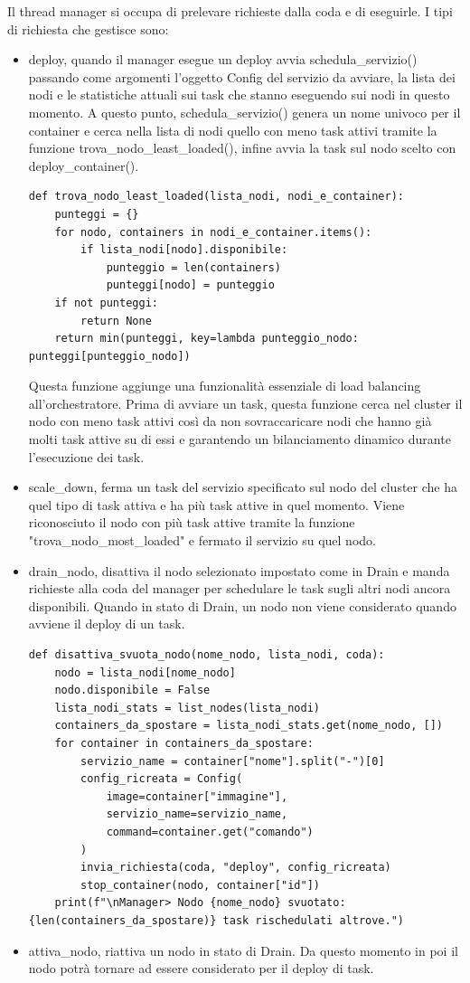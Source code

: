 \documentclass[12pt,a4paper]{article}
\begin{document}
Il thread manager si occupa di prelevare richieste dalla coda e di eseguirle. I tipi di richiesta che gestisce sono:
\begin{itemize}
    \item deploy, quando il manager esegue un deploy avvia schedula\_servizio() passando come argomenti l'oggetto Config del servizio da avviare, la lista dei nodi e le statistiche attuali sui task che stanno eseguendo sui nodi in questo momento. A questo punto, schedula\_servizio() genera un nome univoco per il container e cerca nella lista di nodi quello con meno task attivi tramite la funzione trova\_nodo\_least\_loaded(), infine avvia la task sul nodo scelto con deploy\_container().
    \begin{verbatim}
def trova_nodo_least_loaded(lista_nodi, nodi_e_container):
    punteggi = {}
    for nodo, containers in nodi_e_container.items():
        if lista_nodi[nodo].disponibile:
            punteggio = len(containers)
            punteggi[nodo] = punteggio
    if not punteggi:
        return None
    return min(punteggi, key=lambda punteggio_nodo: punteggi[punteggio_nodo])
\end{verbatim}
    Questa funzione aggiunge una funzionalità essenziale di load balancing all'orchestratore. Prima di avviare un task, questa funzione cerca nel cluster il nodo con meno task attivi così da non sovraccaricare nodi che hanno già molti task attive su di essi e garantendo un bilanciamento dinamico durante l'esecuzione dei task.
    
    \item scale\_down, ferma un task del servizio specificato sul nodo del cluster che ha quel tipo di task attiva e ha più task attive in quel momento. Viene riconosciuto il nodo con più task attive tramite la funzione "trova\_nodo\_most\_loaded" e fermato il servizio su quel nodo.
    
    \item drain\_nodo, disattiva il nodo selezionato impostato come in Drain e manda richieste alla coda del manager per schedulare le task sugli altri nodi ancora disponibili. Quando in stato di Drain, un nodo non viene considerato quando avviene il deploy di un task.
    \begin{verbatim}
def disattiva_svuota_nodo(nome_nodo, lista_nodi, coda):
    nodo = lista_nodi[nome_nodo]
    nodo.disponibile = False
    lista_nodi_stats = list_nodes(lista_nodi)
    containers_da_spostare = lista_nodi_stats.get(nome_nodo, [])
    for container in containers_da_spostare:
        servizio_name = container["nome"].split("-")[0]
        config_ricreata = Config(
            image=container["immagine"],
            servizio_name=servizio_name,
            command=container.get("comando")
        )
        invia_richiesta(coda, "deploy", config_ricreata)
        stop_container(nodo, container["id"])
    print(f"\nManager> Nodo {nome_nodo} svuotato: {len(containers_da_spostare)} task rischedulati altrove.")
    \end{verbatim}
    \item attiva\_nodo, riattiva un nodo in stato di Drain. Da questo momento in poi il nodo potrà tornare ad essere considerato per il deploy di task.
\end{itemize}
\end{document}
